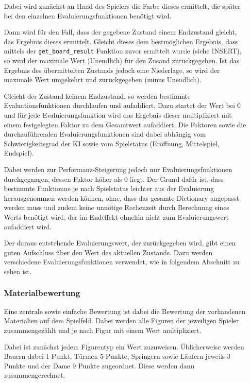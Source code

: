     Dabei wird zunächst an Hand des Spielers die Farbe dieses ermittelt, die
später bei den einzelnen Evaluierungsfunktionen benötigt wird.

Dann wird für den Fall, dass der gegebene Zustand einem Endzustand
gleicht, das Ergebnis dieses ermittelt. Gleicht dieses dem bestmöglichen
Ergebnis, dass mittels der \texttt{get\_board\_result} Funktion zuvor
ermittelt wurde (siehe INSERT), so wird der maximale Wert (Unendlich)
für den Zusand zurückgegeben. Ist das Ergebnis des übermittelten
Zustands jedoch eine Niederlage, so wird der maximale Wert umgekehrt und
zurückgegeben (minus Unendlich).

Gleicht der Zustand keinem Endzustand, so werden bestimmte
Evaluationsfunktionen durchlaufen und aufaddiert. Dazu startet der Wert
bei 0 und für jede Evaluierungsfunktion wird das Ergebnis dieser
multipliziert mit einem festgelegten Faktor zu dem Gesamtwert
aufaddiert. Die Faktoren sowie die durchzuführenden
Evaluierungsfunktionen sind dabei abhängig vom Schwierigkeitsgrad der KI
sowie vom Spielstatus (Eröffnung, Mittelspiel, Endspiel).

Dabei werden zur Performanz-Steigerung jedoch nur Evaluierungsfunktionen
durchgegangen, dessen Faktor höher als 0 liegt. Der Grund dafür ist,
dass bestimmte Funktionne je nach Spielstatus leichter aus der
Evaluierung herausgenommen werden können, ohne, dass das gesamte
Dictionary angepasst werden muss und zudem keine unnötige Rechenzeit
durch Berechnung eines Werts benötigt wird, der im Endeffekt ohnehin
nicht zum Evaluierungswert aufaddiert wird.

Der daraus entstehende Evaluierungswert, der zurückgegeben wird, gibt
einen guten Aufschluss über den Wert des aktuellen Zustands. Dazu werden
verschiedene Evaluierungsfunktionen verwendet, wie in folgendem
Abschnitt zu sehen ist.

    \subsubsection{Materialbewertung}\label{materialbewertung}

Eine zentrale sowie einfache Bewertung ist dabei die Bewertung der
vorhandenen Materialien auf dem Spielfeld. Dabei werden alle Figuren der
jeweiligen Spieler zusammengezählt und je nach Figur mit einem Wert
multipliziert.

Dabei ist zunächst jedem Figurentyp ein Wert zuzuweisen. Üblicherweise
werden Bauern dabei 1 Punkt, Türmen 5 Punkte, Springern sowie Läufern
jeweils 3 Punkte und der Dame 9 Punkte zugeordnet. Diese werden dann
zusammengerechnet.


